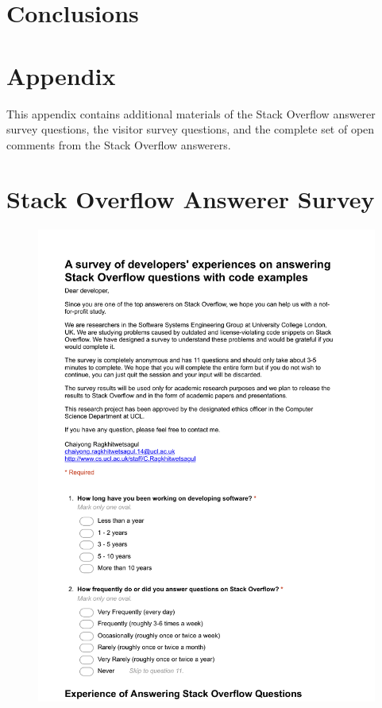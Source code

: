 \documentclass{svjour3}                     %
\begin{document}
\section{Conclusions}

%
%

 

\clearpage
\section{Appendix}

This appendix contains additional materials of the Stack Overflow answerer survey questions, the visitor survey questions, and the complete set of open comments from the Stack Overflow answerers.

\clearpage

\appendix
\section{Stack Overflow Answerer Survey}\label{appendixA}
\begin{figure}[H]
	\centering
	\includegraphics[width=0.8\linewidth]{answerer-1}
	\label{fig:answerer-1}
\end{figure}
\end{document}
